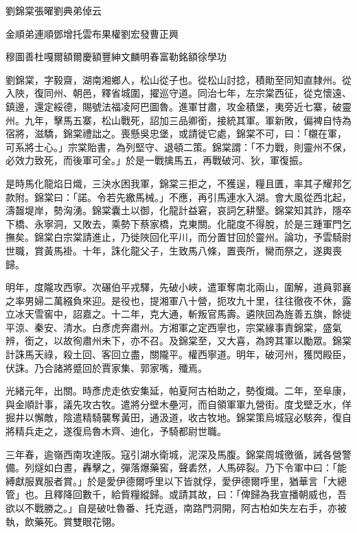 
\begin{pinyinscope}
劉錦棠張曜劉典弟倬云

金順弟連順鄧增托雲布果權劉宏發曹正興

穆圖善杜嘎爾額爾慶額豐紳文麟明春富勒銘額徐學功

劉錦棠，字毅齋，湖南湘鄉人，松山從子也。從松山討捻，積勛至同知直隸州。從入陜，復同州、朝邑，釋省城圍，擢巡守道。同治七年，左宗棠西征，從克懷遠、鎮邊，還定綏德，賜號法福凌阿巴圖魯。進軍甘肅，攻金積堡，夷旁近七寨，破靈州。九年，擊馬五寨，松山戰死，詔加三品卿銜，接統其軍。軍新敗，偏裨自恃為宿將，滋驕，錦棠禮詘之。喪懸吳忠堡，或請徙它處，錦棠不可，曰：「櫬在軍，可系將士心。」宗棠貽書，為列堅守、退頓二策。錦棠謂：「不力戰，則靈州不保，必效力致死，而後軍可全。」於是一戰擒馬五，再戰破河、狄，軍復振。

是時馬化龍焰日熾，三決水困我軍，錦棠三拒之，不獲逞，糧且匱，率其子耀邦乞款附。錦棠曰：「諾。令若先繳馬械。」不應，再引馬連水入湖。會大風從西北起，濤齧堤岸，勢洶湧。錦棠囊土以御，化龍計益窘，哀詞乞耕墾。錦棠知其詐，隱卒下橋、永寧洞，又敗去，乘勢下蔡家橋，克東關。化龍度不得脫，於是三踵軍門乞撫矣。錦棠白宗棠請進止，乃徙陜回化平川，而分置甘回於靈州。論功，予雲騎尉世職，賞黃馬褂。十年，誅化龍父子，生致馬八條，置喪所，臠而祭之，遂輿喪歸。

明年，度隴攻西寧。次碾伯平戎驛，先破小峽，遣軍奪南北兩山，圍解，道員郭襄之率男婦二萬繦負來迎。是役也，提湘軍八十營，扼攻九十里，往往徹夜不休，露立冰天雪窖中，詔嘉之。十二年，克大通，斬叛官馬壽。遴陜回為旌善五旗，餘徙平涼、秦安、清水。白彥虎奔肅州。方湘軍之定西寧也，宗棠緣事責錦棠，盛氣辨，銜之，以故徇肅州未下，亦不召。及錦棠至，又大喜，為誇其軍以勵眾。錦棠計誅馬天祿，殺土回、客回立盡，關隴平。權西寧道。明年，破河州，獲閃殿臣，伏誅。乃合諸將蹙回於賈家集、郭家嘴，殲焉。

光緒元年，出關。時彥虎走依安集延，帕夏阿古柏助之，勢復熾。二年，至阜康，與金順計事，議先攻古牧。遣將分壁木壘河，而自領軍軍九營街。度戈壁乏水，佯掘井以懈敵，陰遣精騎襲奪黃田，通汲道，收古牧地。錦棠策烏城寇必駭奔，復自將精兵走之，遂復烏魯木齊、迪化，予騎都尉世職。

三年春，逾嶺西南攻達阪。寇引湖水衛城，泥深及馬腹。錦棠周城徼循，誡各營警備。列燧如白晝，轟擊之，彈落爆藥窖，聲砉然，人馬碎裂。乃下令軍中曰：「能縛獻服異服者賞。」於是愛伊德爾呼里以下皆就俘，愛伊德爾呼里，猶華言「大總管」也。且釋降回數千，給貲糧縱歸。或請其故，曰：「俾歸為我宣播朝威也，吾欲以不戰勝之。」自是破吐魯番、托克遜，南路門洞開，阿古柏如失左右手，亦被執，飲藥死。賞雙眼花翎。


\end{pinyinscope}
